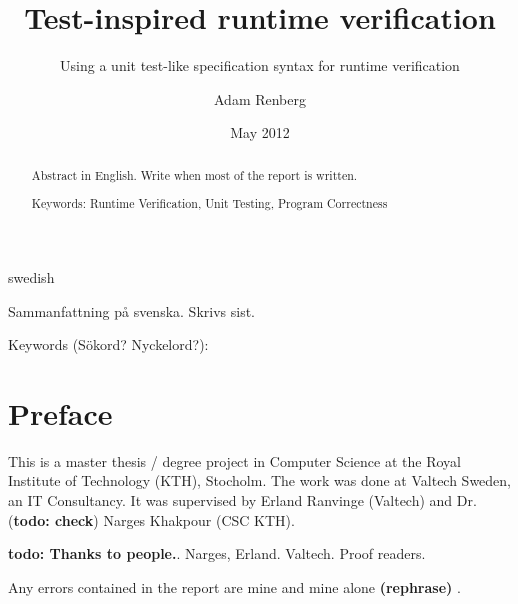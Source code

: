 \documentclass[a4paper,11pt]{kth-mag}
\title{Test-inspired runtime verification}
\subtitle{Using a unit test-like specification syntax for runtime verification}
\author{Adam Renberg}
\date{May 2012}
\newcommand{\todo}[1]{\textbf{todo: #1}}
\newcommand{\rephrase}{\textbf{(rephrase)} }
\begin{document}

\frontmatter
\pagestyle{empty}
\removepagenumbers
\maketitle
{}





\begin{abstract}

Abstract in English. Write when most of the report is written.

\bigskip\noindent
Keywords: Runtime Verification, Unit Testing, Program Correctness
\end{abstract}
\clearpage

\begin{foreignabstract}{swedish}

Sammanfattning på svenska. Skrivs sist.

\bigskip\noindent
Keywords (Sökord? Nyckelord?):
\end{foreignabstract}
\clearpage





\pagestyle{newchap}
\chapter*{Preface}

This is a master thesis / degree project in Computer Science at the Royal
Institute of Technology (KTH), Stocholm. The work was done at Valtech Sweden,
an IT Consultancy. It was supervised by Erland Ranvinge (Valtech) and Dr.
(\todo{check}) Narges Khakpour (CSC KTH).

\todo{Thanks to people.}. Narges, Erland. Valtech. Proof readers.

Any errors contained in the report are mine and mine alone \rephrase.
\clearpage

\pagestyle{newchap}
\tableofcontents*
\mainmatter




\end{document}
